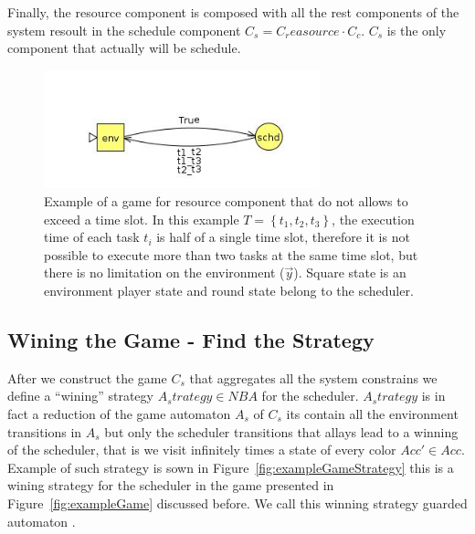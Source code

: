 \documentclass[ twoside, 12pt ]{article}
\begin{document}
Finally, the resource component is composed with all the rest components of the system resoult in the schedule component $C_s = C_reasource \cdot C_c$. $C_s$ is the only component that actually will be schedule.

\begin{figure} %
    \centerline{\includegraphics[width=80mm]{reasourceGame.jpg}}
    \caption{Example of a game for resource component that do not allows to exceed a time slot. 
        In this example $T = \left\{ t_1 , t_2 , t_3 \right\}$, the execution time of each task $t_i$ is half of a single time slot, therefore it is not possible to execute more than two tasks at the same time slot, but there is no limitation on the environment ($\vec{y}$).
        Square state is an environment player state and round state belong to the scheduler.  }
    \label{fig:C_reasource}
\end{figure}

\subsection{Wining the Game - Find the Strategy}

After we construct the game $C_s$ that aggregates all the system constrains we define a ``wining'' strategy $A_strategy \in NBA$ for the scheduler.
$A_strategy$ is in fact a reduction of the game automaton $A_s$ of $C_s$ its contain all the environment transitions in $A_s$ but only the scheduler transitions that allays lead to a winning of the scheduler, that is we visit infinitely times a state of every color $Acc' \in Acc$.
Example of such strategy is sown in Figure~\ref{fig:exampleGameStrategy} this is a wining strategy for the scheduler in the game presented in Figure~\ref{fig:exampleGame} discussed before.
We call this winning strategy guarded automaton .
\end{document}
